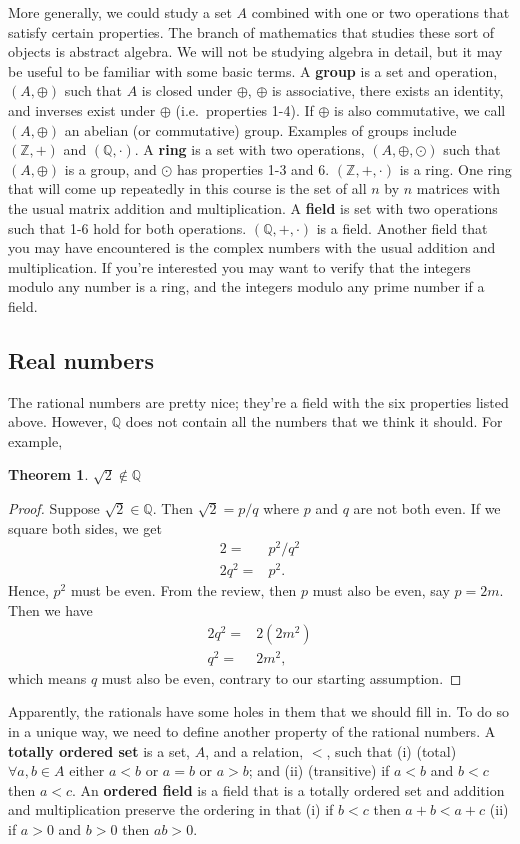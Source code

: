 \documentclass[12pt,reqno]{amsart}
\newtheorem{theorem}{Theorem}[section]
\theoremstyle{definition}
\begin{document}
More generally, we could study a set $A$ combined with one or two
operations that satisfy certain properties. The branch of mathematics
that studies these sort of objects is abstract algebra. We will not be
studying algebra in detail, but it may be useful to be familiar with
some basic terms. A \textbf{group} is a set and operation,
$(A,\oplus)$ such that $A$ is closed under $\oplus$, $\oplus$ is
associative, there exists an identity, and inverses exist under
$\oplus$ (i.e.\ properties 1-4). If $\oplus$ is also commutative, we
call $(A,\oplus)$ an abelian (or commutative) group. Examples of
groups include $(\mathbb{Z},+)$ and $(\mathbb{Q},\cdot)$. A
\textbf{ring} is a set with two operations, $(A,\oplus,\odot)$ such
that $(A,\oplus)$ is a group, and $\odot$ has properties 1-3 and
6. $(\mathbb{Z},+,\cdot)$ is a ring.  One ring that will come up
repeatedly in this course is the set of all $n$ by $n$ matrices with
the usual matrix addition and multiplication. A \textbf{field} is set
with two operations such that 1-6 hold for both
operations. $(\mathbb{Q},+,\cdot)$ is a field. Another field that you
may have encountered is the complex numbers with the usual addition
and multiplication. If you're interested you may want to verify that
the integers modulo any number is a ring, and the integers modulo any
prime number if a field.

\subsection{Real numbers}

The rational numbers are pretty nice; they're a field with the six
properties listed above. However, $\mathbb{Q}$ does not contain all
the numbers that we think it should. For example,
\begin{theorem}
  $\sqrt{2} \not\in \mathbb{Q}$
\end{theorem}
\begin{proof}
  Suppose $\sqrt{2} \in \mathbb{Q}$. Then $\sqrt{2} = p / q$ where $p$
  and $q$ are not both even. If we square both sides, we get
  \begin{align*}
    2 = & p^2 / q^2 \\
    2 q^2 = & p^2.
  \end{align*}
  Hence, $p^2$ must be even. From the review, then $p$ must also be
  even, say $p = 2m$. Then we have
  \begin{align*}
    2 q^2 = & 2(2 m^2) \\
    q^2 = & 2 m^2,
  \end{align*}
  which means $q$ must also be even, contrary to our starting
  assumption. 
\end{proof}
Apparently, the rationals have some holes in them that we should fill
in. To do so in a unique way, we need to define another property of
the rational numbers. A \textbf{totally ordered set} is a set, $A$,
and a relation, $<$, such that (i) (total) $\forall a,b \in A$ either
$a < b$ or $a = b$ or $a > b$; and (ii) (transitive) if $a < b$ and $b
< c$ then $a < c$. An \textbf{ordered field} is a field that is a
totally ordered set and addition and multiplication preserve the
ordering in that (i) if $b<c$ then $a + b < a + c$ (ii) if $a>0$ and
$b>0$ then $ab>0$.
\end{document}
